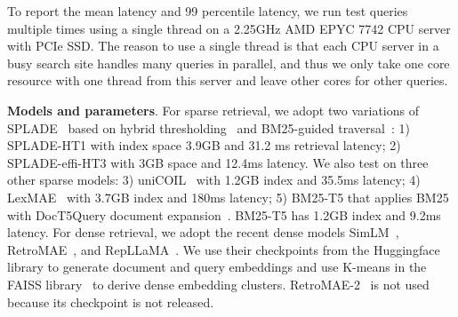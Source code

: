 To report the mean latency and 99 percentile latency, 
we  run test queries multiple times using a single thread on  a 2.25GHz AMD EPYC 7742  CPU server with PCIe SSD.
The reason to use a single thread is that each CPU server in a busy search site handles many queries in parallel, and thus we only take
one core resource with one thread from this server and leave other cores  for other queries.

{\bf Models and parameters}.
For sparse retrieval, we adopt two variations of 
SPLADE~\cite{Formal2021SPLADE, Formal_etal_SIGIR2022_splade++,Lassance2022SPLADE-efficient} 
based on hybrid thresholding~\cite{2023SIGIR-Qiao} and  BM25-guided traversal~\cite{mallia2022faster,qiao2023optimizing}:
1) SPLADE-HT1 with index space 3.9GB and 31.2 ms retrieval latency; 
2) SPLADE-effi-HT3 with  3GB space and  12.4ms latency. 
We also test on three other sparse models:
3) uniCOIL~\cite{ Lin2021unicoil,2021NAACL-Gao-COIL} with 1.2GB index and 35.5ms latency;
4) LexMAE~\cite{shen2023lexmae} with 3.7GB index and 180ms latency;
5) BM25-T5 that applies  BM25 with  DocT5Query document expansion~\cite{Cheriton2019doct5query}.  
BM25-T5 has 1.2GB index and  9.2ms latency. 
For dense retrieval, we adopt the recent dense models
SimLM~\cite{Wang2022SimLM}, RetroMAE~\cite{Liu2022RetroMAE}, and
RepLLaMA~\cite{ma2023finetuning}. 
We use their checkpoints from the Huggingface library to generate document and query embeddings 
and  use  K-means in the FAISS library~\cite{johnson2019billion} to derive dense embedding clusters.
RetroMAE-2~\cite{liu-etal-2023-retromae} is not used because its checkpoint is not released.


